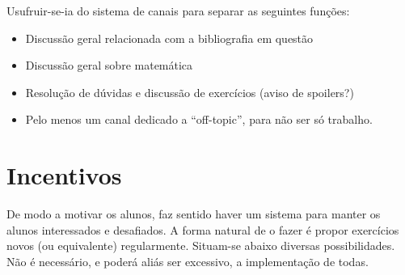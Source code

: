 \documentclass{article}
\begin{document}
	Usufruir-se-ia do sistema de canais para separar as seguintes funções:

	\begin{itemize}
	\item Discussão geral relacionada com a bibliografia em questão

	\item Discussão geral sobre matemática

	\item Resolução de dúvidas e discussão de exercícios (aviso de spoilers?)

	\item Pelo menos um canal dedicado a ``off-topic'', para não ser só trabalho.
	\end{itemize}

	\section{Incentivos}\label{incentivos}

	De modo a motivar os alunos, faz sentido haver um sistema para manter os alunos interessados e desafiados. A forma natural de o fazer é propor exercícios novos (ou equivalente) regularmente. Situam-se abaixo diversas possibilidades. Não é necessário, e poderá aliás ser excessivo, a implementação de todas.
\end{document}
